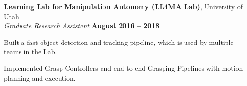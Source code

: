 \documentclass[margin, line]{resume}
\begin{document}
\begin{resume}
	\href{https://robot-learning.cs.utah.edu}{\textbf{Learning Lab for Manipulation Autonomy (LL4MA Lab)}}, University of Utah \vspace{1pt}\\\vspace{1pt}%
	\textsl{Graduate Research Assistant} \hfill \textbf{August 2016 -- 2018}\\ \vspace{-4.5mm}
	\begin{list2}
		\item Built a fast object detection and tracking pipeline, which is used by multiple teams in the Lab.
		\item Implemented Grasp Controllers and end-to-end Grasping Pipelines with motion planning and execution.
	\end{list2}\vspace{-0.1mm}
	


    
	\sectionline

\end{resume}
\end{document}
